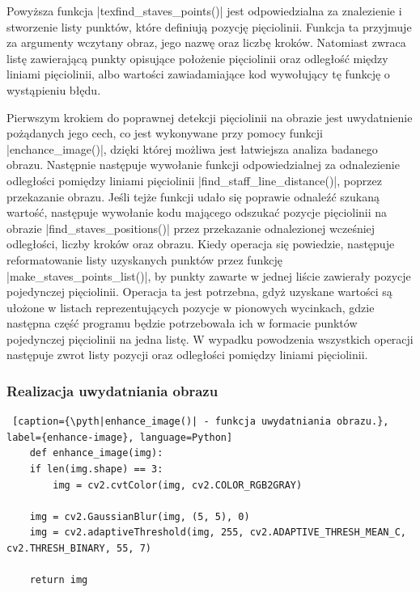 Powyższa funkcja \pyth|texfind_staves_points()| jest odpowiedzialna za znalezienie i stworzenie listy punktów, które definiują pozycję pięciolinii. Funkcja ta przyjmuje za argumenty wczytany obraz, jego nazwę oraz liczbę kroków. Natomiast zwraca listę zawierającą punkty opisujące położenie pięciolinii oraz odległość między liniami pięciolinii, albo wartości zawiadamiające kod wywołujący tę funkcję o wystąpieniu błędu.

Pierwszym krokiem do poprawnej detekcji pięciolinii na obrazie jest uwydatnienie pożądanych jego cech, co jest wykonywane przy pomocy funkcji \pyth|enchance_image()|, dzięki której możliwa jest łatwiejsza analiza badanego obrazu. Następnie następuje wywołanie funkcji odpowiedzialnej za odnalezienie odległości pomiędzy liniami pięciolinii \pyth|find_staff_line_distance()|, poprzez przekazanie obrazu. Jeśli tejże funkcji udało się poprawie odnaleźć szukaną wartość, następuje wywołanie kodu mającego odszukać pozycje pięciolinii na obrazie \pyth|find_staves_positions()| przez przekazanie odnalezionej wcześniej odległości, liczby kroków oraz obrazu. Kiedy operacja się powiedzie, następuje reformatowanie listy uzyskanych punktów przez funkcję \pyth|make_staves_points_list()|, by punkty zawarte w jednej liście zawierały pozycje pojedynczej pięciolinii. Operacja ta jest potrzebna, gdyż uzyskane wartości są ułożone w listach reprezentujących pozycje w pionowych wycinkach, gdzie następna część programu będzie potrzebowała ich w formacie punktów pojedynczej pięciolinii na jedna listę. W wypadku powodzenia wszystkich operacji następuje zwrot listy pozycji oraz odległości pomiędzy liniami pięciolinii.



\subsubsection{Realizacja uwydatniania obrazu} \label{enhance_image_impl}

\begin{lstlisting} [caption={\pyth|enhance_image()| - funkcja uwydatniania obrazu.}, label={enhance-image}, language=Python]
	def enhance_image(img):
	if len(img.shape) == 3:
		img = cv2.cvtColor(img, cv2.COLOR_RGB2GRAY)
	
	img = cv2.GaussianBlur(img, (5, 5), 0)
	img = cv2.adaptiveThreshold(img, 255, cv2.ADAPTIVE_THRESH_MEAN_C, cv2.THRESH_BINARY, 55, 7)
	
	return img
\end{lstlisting}

